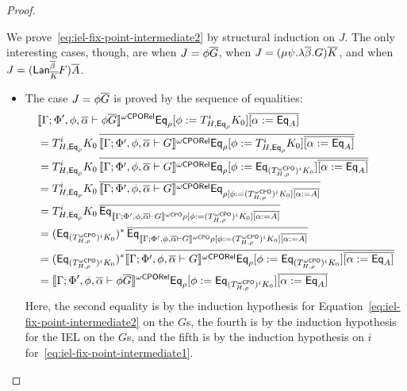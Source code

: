 \documentclass[acmsmall,review,anonymous]{acmart}
\theoremstyle{definition}
\begin{document}
\begin{proof}
\begin{itemize}
We prove~\eqref{eq:iel-fix-point-intermediate2} by structural
induction on $J$. The only interesting cases, though, are when $J =
\phi \overline{G}$, when $J = (\mu \psi.\lambda \overline{\beta}. G)\overline{K}$, and when
$J = (\mathsf{Lan}_{\overline{K}}^{\overline{\beta}} F)\overline{A}$.
\begin{itemize}
\item The case $J = \phi \overline{G}$ is proved by the sequence of equalities:
\[
\begin{split}
& \llbracket{\Gamma; \Phi', \phi, \overline{\alpha} \vdash \phi
    \overline{G}}\rrbracket^{{\omega\mathsf{CPORel}}} \mathsf{Eq}_{\rho} [\phi := T^i_{H,\mathsf{Eq}_{\rho}} K_0]
  \overline{[\alpha := \mathsf{Eq}_A]}
  \\
&= T^i_{H,\mathsf{Eq}_{\rho}} K_0\, \overline{\llbracket{\Gamma; \Phi',
      \phi, \overline{\alpha} \vdash G}\rrbracket^{{\omega\mathsf{CPORel}}} \mathsf{Eq}_{\rho} [\phi :=
      T^i_{H,\mathsf{Eq}_{\rho}} K_0] \overline{[\alpha :=
        \mathsf{Eq}_A]}} \\ 
&= T^i_{H,\mathsf{Eq}_{\rho}} K_0\, \overline{\llbracket{\Gamma; \Phi',
      \phi, \overline{\alpha} \vdash G}\rrbracket^{{\omega\mathsf{CPORel}}} \mathsf{Eq}_{\rho} [\phi :=
      \mathsf{Eq}_{(T^{\omega\mathsf{CPO}}_{H,\rho})^i K_0}] \overline{[\alpha :=
        \mathsf{Eq}_A]}} \\ 
&= T^i_{H,\mathsf{Eq}_{\rho}} K_0\, \overline{\llbracket{\Gamma; \Phi',
      \phi, \overline{\alpha} \vdash G}\rrbracket^{{\omega\mathsf{CPORel}}} \mathsf{Eq}_{\rho [\phi := (T^{\omega\mathsf{CPO}}_{H,\rho})^i
        K_0] \overline{[\alpha := A]}}} \\ 
&= T^i_{H,\mathsf{Eq}_{\rho}} K_0\, \overline{\mathsf{Eq}_{\llbracket{\Gamma;
        \Phi', \phi, \overline{\alpha} \vdash G}\rrbracket^{{\omega\mathsf{CPO}}} \rho [\phi :=
        (T^{\omega\mathsf{CPO}}_{H,\rho})^i K_0] \overline{[\alpha :=
          A]}}} \\ 
&= (\mathsf{Eq}_{(T^{\omega\mathsf{CPO}}_{H,\rho})^i K_0})^* \,\overline{\mathsf{Eq}_{\llbracket{\Gamma;
        \Phi', \phi, \overline{\alpha} \vdash G}\rrbracket^{{\omega\mathsf{CPO}}} \rho [\phi :=
        (T^{\omega\mathsf{CPO}}_{H,\rho})^i K_0] \overline{[\alpha :=
          A]}}} \\ 
&= (\mathsf{Eq}_{(T^{\omega\mathsf{CPO}}_{H,\rho})^i K_0})^* \overline{\llbracket{\Gamma;
      \Phi', \phi, \overline{\alpha} \vdash G}\rrbracket^{{\omega\mathsf{CPORel}}} \mathsf{Eq}_{\rho} [\phi :=
      \mathsf{Eq}_{(T^{\omega\mathsf{CPO}}_{H,\rho})^i K_0}] \overline{[\alpha :=
        \mathsf{Eq}_A]}} \\ 
&= \llbracket{\Gamma; \Phi', \phi, \overline{\alpha} \vdash \phi \overline{G}}\rrbracket^{{\omega\mathsf{CPORel}}}
  \mathsf{Eq}_{\rho} [\phi := \mathsf{Eq}_{(T^{\omega\mathsf{CPO}}_{H,\rho})^i K_0}]
  \overline{[\alpha := \mathsf{Eq}_A]} 
\end{split}
\]
Here, the second equality is by the induction hypothesis for
Equation~\ref{eq:iel-fix-point-intermediate2} on the $G$s, the fourth
is by the induction hypothesis for the IEL on the $G$s, and the fifth
is by the induction hypothesis on $i$
for~\eqref{eq:iel-fix-point-intermediate1}.


\end{itemize}
\end{itemize}
\end{proof}
\end{document}
